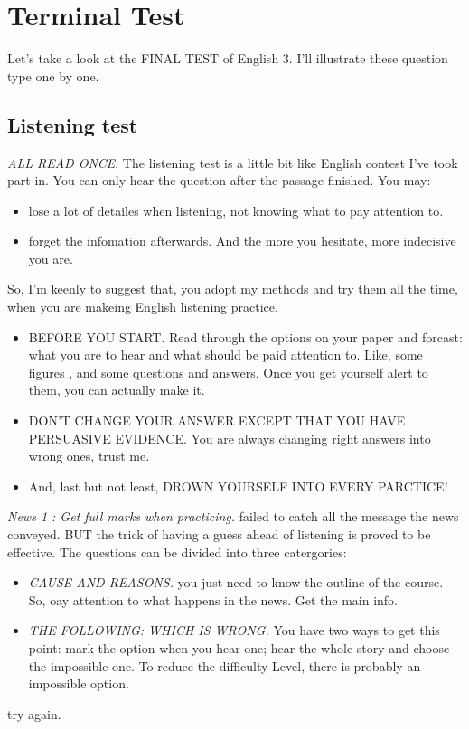 \documentclass[10pt]{article}
\begin{document}
 
 
\section{Terminal Test}

Let's take a look at the FINAL TEST of English 3. I'll illustrate these question type one by one.
\subsection{Listening test}
\emph{ALL READ ONCE}. The listening test is a little bit like English contest I've took part in. You can only hear the question after the passage finished. You may:
\begin{itemize}
    \item lose a lot of detailes when listening, not knowing what to pay attention to. 
    \item forget the infomation afterwards. And the more you hesitate, more indecisive you are. 
\end{itemize}
So, I'm keenly to suggest that, you adopt my methods and try them all the time, when you are makeing English listening practice.
\begin{itemize}
    \item BEFORE YOU START. Read through the options on your paper and forcast: what you are to hear and what should be paid attention to. Like, some figures , and some questions and answers. Once you get yourself alert to them, you can actually make it.
    \item DON'T CHANGE YOUR ANSWER EXCEPT THAT YOU HAVE PERSUASIVE EVIDENCE. You are always changing right answers into wrong ones, trust me.
    \item And, last but not least, DROWN YOURSELF INTO EVERY PARCTICE!
\end{itemize}

\emph{News 1 : Get full marks when practicing.} failed to catch all the message the news conveyed. BUT the trick of having a guess ahead of listening is proved to be effective. 
The questions can be divided into three catergories:
\begin{itemize}
    \item \emph{CAUSE AND REASONS.} you just need to know the outline of the course. So, oay attention to what happens in the news. Get the main info.
    \item \emph{THE FOLLOWING: WHICH IS WRONG.} You have two ways to get this point: mark the option when you hear one; hear the whole story and choose the impossible one. To reduce the difficulty Level, there is probably an impossible option.
\end{itemize}
try again.
\end{document}
